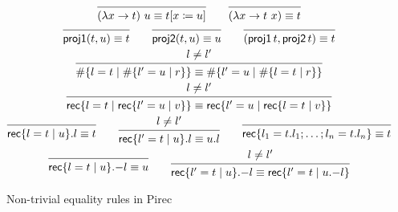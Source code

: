 \begin{figure}
  \begin{gather*}
    \begin{prooftree}
      \infer0{(\lambda x \to t)\ u \equiv t[x \coleqq u]}
    \end{prooftree}
    \qquad
    \begin{prooftree}
      \infer0{(\lambda x \to t\ x) \equiv t}
    \end{prooftree}
    \\
    \begin{prooftree}
      \infer0{\ProjOne (t, u) \equiv t}
    \end{prooftree}
    \qquad
    \begin{prooftree}
      \infer0{\ProjTwo (t, u) \equiv u}
    \end{prooftree}
    \qquad
    \begin{prooftree}
      \infer0{(\ProjOne t, \ProjTwo t) \equiv t}
    \end{prooftree}
    \\
    \begin{prooftree}
      \hypo{l \neq l'}
      \infer1{\# \{ l = t \mid \# \{ l' = u \mid r \} \}
        \equiv \# \{ l' = u \mid \# \{ l = t \mid r \} \}}
    \end{prooftree}
    \\
    \begin{prooftree}
      \hypo{l \neq l'}
      \infer1{\RecordLit \{ l = t \mid \RecordLit \{ l' = u \mid v \} \}
        \equiv \RecordLit \{ l' = u \mid \RecordLit \{ l = t \mid v \} \}}
    \end{prooftree}
    \\
    \begin{prooftree}
      \infer0{\RecordLit \{ l = t \mid u \}.l \equiv t}
    \end{prooftree}
    \qquad
    \begin{prooftree}
      \hypo{l \neq l'}
      \infer1{\RecordLit \{ l' = t \mid u \}.l \equiv u.l}
    \end{prooftree}
    \qquad
    \begin{prooftree}
      \infer0{\RecordLit \{ l_1 = t.l_1; \dots; l_n = t.l_n \} \equiv t}
    \end{prooftree}
    \\
    \begin{prooftree}
      \infer0{\RecordLit \{ l = t \mid u \} \RecordRestr l \equiv u }
    \end{prooftree}
    \qquad
    \begin{prooftree}
      \hypo{l \neq l'}
      \infer1{\RecordLit \{ l' = t \mid u \} \RecordRestr l \equiv
        \RecordLit \{ l' = t \mid u \RecordRestr l \}}
    \end{prooftree}
  \end{gather*}
  \caption{Non-trivial equality rules in Pirec}\label{fig:equality}
\end{figure}

